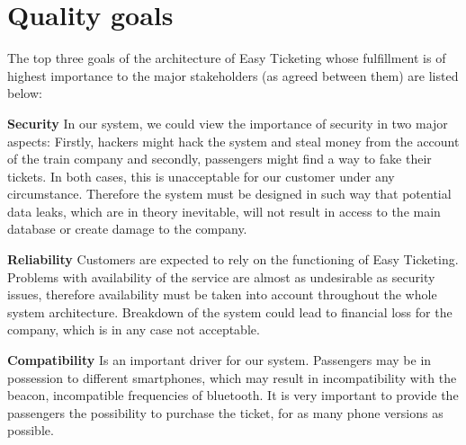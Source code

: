 \section{Quality goals}

The top three goals of the architecture of Easy Ticketing whose fulfillment is of highest importance to the major stakeholders (as agreed between them) are listed below:

\textbf{Security} In our system, we could view the importance of security in two major aspects: Firstly, hackers might hack the system and steal money from the account of the train company and secondly, passengers might find a way to fake their tickets. In both cases, this is unacceptable for our customer under any circumstance. Therefore the system must be designed in such way that potential data leaks, which are in theory inevitable, will not result in access to the main database or create damage to the company.

\textbf{Reliability}  Customers are expected to rely on the functioning of Easy Ticketing. Problems with availability of the service are almost as undesirable as security issues, therefore availability must be taken into account throughout the whole system architecture. Breakdown of the system could lead to financial loss for the company, which is in any case not acceptable.

\textbf{Compatibility} Is an important driver for our system. Passengers may be in possession to different smartphones, which may result in incompatibility with the beacon, incompatible frequencies of bluetooth. It is very important to provide the passengers the possibility to purchase the ticket, for as many phone versions as possible.
